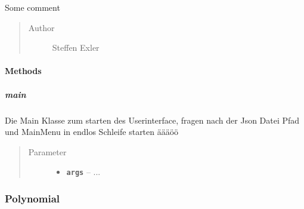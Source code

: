 \documentclass[letterpaper,10pt,ngerman]{sphinxmanual}
\begin{document}
\begin{fulllineitems}
\label{com/linuxluigi/polynomial/Main:com.linuxluigi.polynomial.Main}
Some comment
\begin{quote}\begin{description}
\item[{Author}] \leavevmode
Steffen Exler

\end{description}\end{quote}

\end{fulllineitems}



\paragraph{Methods}
\label{com/linuxluigi/polynomial/Main:methods}

\subparagraph{main}
\label{com/linuxluigi/polynomial/Main:id1}

\begin{fulllineitems}
\label{com/linuxluigi/polynomial/Main:com.linuxluigi.polynomial.Main.main(String__)}
Die Main Klasse zum starten des Userinterface, fragen nach der Json Datei Pfad und MainMenu in endlos Schleife starten äääöö
\begin{quote}\begin{description}
\item[{Parameter}] \leavevmode\begin{itemize}
\item {} 
\textbf{\texttt{args}} -- 
...


\end{itemize}

\end{description}\end{quote}

\end{fulllineitems}



\subsubsection{Polynomial}
\label{com/linuxluigi/polynomial/Polynomial:polynomial}\label{com/linuxluigi/polynomial/Polynomial::doc}
\end{document}
